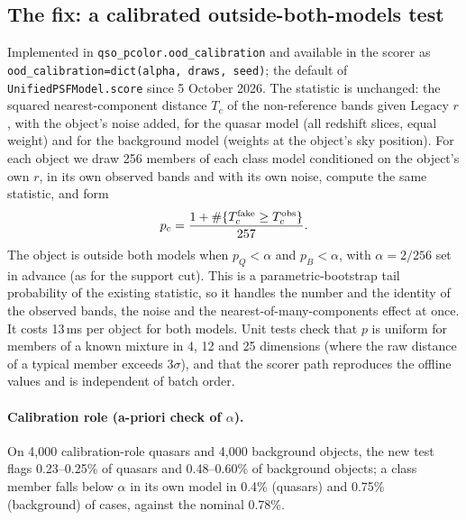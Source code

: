 \documentclass[11pt,a4paper]{article}
\newcommand{\code}[1]{\texttt{#1}}
\begin{document}
\subsection{The fix: a calibrated outside-both-models test}\label{sec:fix}
Implemented in \code{qso\_pcolor.ood\_calibration} and available in the scorer as
\code{ood\_calibration=dict(alpha, draws, seed)}; the default of \code{UnifiedPSFModel.score} since 5 October 2026. The statistic is unchanged: the
squared nearest-component distance $T_c$ of the non-reference bands given Legacy $r$, with the object's noise
added, for the quasar model (all redshift slices, equal weight) and for the background model (weights at the
object's sky position). For each object we draw 256 members of each class model conditioned on the object's own
$r$, in its own observed bands and with its own noise, compute the same statistic, and form
\[
p_c=\frac{1+\#\{T_c^{\rm fake}\ge T_c^{\rm obs}\}}{257}.
\]
The object is outside both models when $p_Q<\alpha$ and $p_B<\alpha$, with $\alpha=2/256$ set in advance (as for
the support cut). This is a parametric-bootstrap tail probability of the existing statistic, so it handles the
number and the identity of the observed bands, the noise and the nearest-of-many-components effect at once. It costs
13\,ms per object for both models. Unit tests check that $p$ is uniform for members of a known mixture in 4, 12 and
25 dimensions (where the raw distance of a typical member exceeds $3\sigma$), and that the scorer path reproduces
the offline values and is independent of batch order.

\paragraph{Calibration role (a-priori check of $\alpha$).} On 4,000 calibration-role quasars and 4,000 background
objects, the new test flags 0.23--0.25\% of quasars and 0.48--0.60\% of background objects; a class member falls
below $\alpha$ in its own model in 0.4\% (quasars) and 0.75\% (background) of cases, against the nominal 0.78\%.
\end{document}
